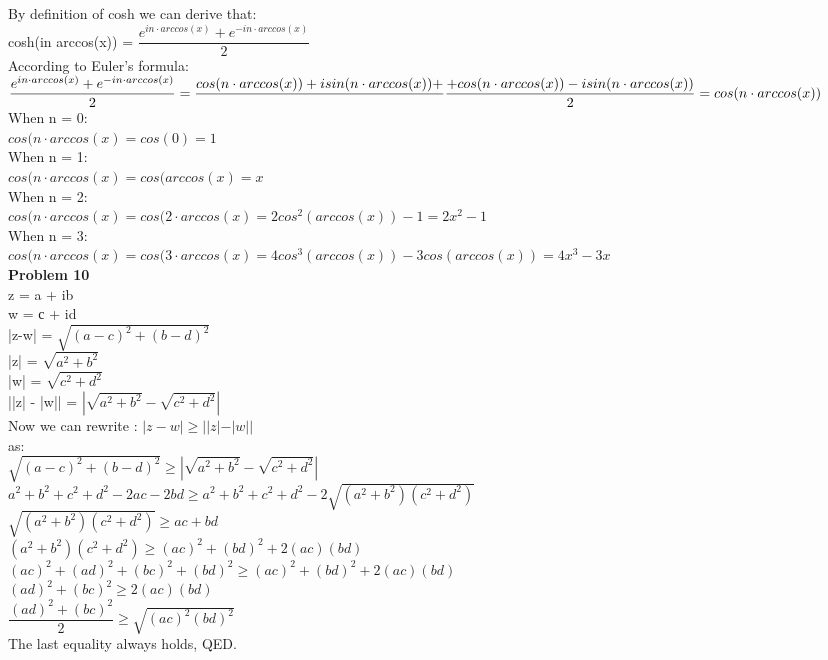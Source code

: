 \documentclass[12pt]{article}
\begin{document}
    By definition of cosh we can derive that:\\
    cosh(in arccos(x)) = $\dfrac{e^{in \cdot arccos(x)} + e^{-in \cdot arccos(x)} }{2}$\\
    According to Euler's formula:\\
	$\dfrac{e^{in \cdot arccos(x)} + e^{-in \cdot arccos(x)} }{2} = \dfrac{cos(n\cdot arccos(x)) + i sin(n\cdot arccos(x)) +}{}\\ \dfrac{+ cos(n\cdot arccos(x)) -  i sin(n\cdot arccos(x))}{2} = cos(n\cdot arccos(x))$\\
	When n = 0:\\
	$cos(n\cdot arccos(x) = cos(0) = 1$\\
	When n = 1:\\
	$cos(n\cdot arccos(x) = cos(arccos(x) = x$\\
	When n = 2:\\
	$cos(n\cdot arccos(x) = cos(2\cdot arccos(x) = 2cos^2(arccos(x)) - 1 = 2x^2 - 1$\\
	When n = 3:\\
	$cos(n\cdot arccos(x) = cos(3\cdot arccos(x) = 4cos^3(arccos(x)) - 3 cos(arccos(x)) = 4x^3 - 3x$\\
 
    \textbf{Problem 10}\\
    z = a + ib\\
    w = с + id\\
    |z-w| = $\sqrt{(a-c)^2 + (b-d)^2}$\\
    |z| = $\sqrt{a^2 + b^2}$\\
    |w| = $\sqrt{c^2 + d^2}$\\
    ||z| - |w|| = $|\sqrt{a^2 + b^2} - \sqrt{c^2 + d^2}|$\\
    Now we can rewrite :
    $ |z-w| \geq ||z| - |w|| $\\
    as:\\
    $\sqrt{(a-c)^2 + (b-d)^2} \geq | \sqrt{a^2 + b^2} - \sqrt{c^2 + d^2	}|$\\
    $a^2 + b^2 +c^2 +d^2 - 2ac - 2bd \geq a^2 + b^2 + c^2 +d^2 - 2\sqrt{(a^2 + b^2)(c^2 + d^2)}$\\
    $ \sqrt{(a^2 + b^2)(c^2 + d^2)} \geq  ac + bd $\\
    $ (a^2 + b^2)(c^2 + d^2) \geq  (ac)^2 + (bd)^2 + 2(ac)(bd) $\\
    $ (ac)^2 + (ad)^2 + (bc)^2 + (bd)^2 \geq  (ac)^2 + (bd)^2 + 2(ac)(bd) $\\
    $ (ad)^2 + (bc)^2 \geq  2(ac)(bd) $\\
    $ \dfrac{(ad)^2 + (bc)^2}{2} \geq  \sqrt{(ac)^2(bd)^2} $\\
    The last equality always holds, QED.
    
\end{document}

